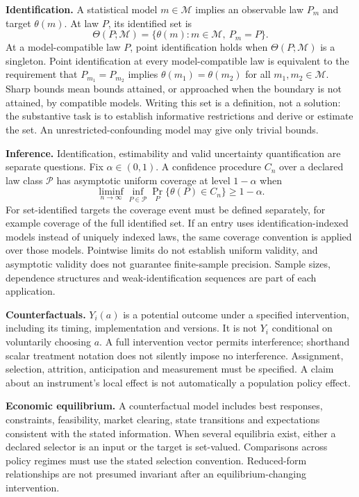\documentclass[11pt,a4paper]{article}
\begin{document}
\textbf{Identification.} A statistical model $m\in\mathcal M$ implies an observable law $P_m$ and target $\theta(m)$. At law $P$, its identified set is
\[
\Theta(P;\mathcal M)=\{\theta(m):m\in\mathcal M,\ P_m=P\}.
\]
At a model-compatible law $P$, point identification holds when $\Theta(P;\mathcal M)$ is a singleton. Point identification at every model-compatible law is equivalent to the requirement that $P_{m_1}=P_{m_2}$ implies $\theta(m_1)=\theta(m_2)$ for all $m_1,m_2\in\mathcal M$. Sharp bounds mean bounds attained, or approached when the boundary is not attained, by compatible models. Writing this set is a definition, not a solution: the substantive task is to establish informative restrictions and derive or estimate the set. An unrestricted-confounding model may give only trivial bounds.

\textbf{Inference.} Identification, estimability and valid uncertainty quantification are separate questions. Fix $\alpha\in(0,1)$. A confidence procedure $C_n$ over a declared law class $\mathcal P$ has asymptotic uniform coverage at level $1-\alpha$ when
\[
\liminf_{n\to\infty}\inf_{P\in\mathcal P}\Pr_P\{\theta(P)\in C_n\}\geq1-\alpha.
\]
For set-identified targets the coverage event must be defined separately, for example coverage of the full identified set. If an entry uses identification-indexed models instead of uniquely indexed laws, the same coverage convention is applied over those models. Pointwise limits do not establish uniform validity, and asymptotic validity does not guarantee finite-sample precision. Sample sizes, dependence structures and weak-identification sequences are part of each application.

\textbf{Counterfactuals.} $Y_i(a)$ is a potential outcome under a specified intervention, including its timing, implementation and versions. It is not $Y_i$ conditional on voluntarily choosing $a$. A full intervention vector permits interference; shorthand scalar treatment notation does not silently impose no interference. Assignment, selection, attrition, anticipation and measurement must be specified. A claim about an instrument's local effect is not automatically a population policy effect.

\textbf{Economic equilibrium.} A counterfactual model includes best responses, constraints, feasibility, market clearing, state transitions and expectations consistent with the stated information. When several equilibria exist, either a declared selector is an input or the target is set-valued. Comparisons across policy regimes must use the stated selection convention. Reduced-form relationships are not presumed invariant after an equilibrium-changing intervention.
\end{document}
